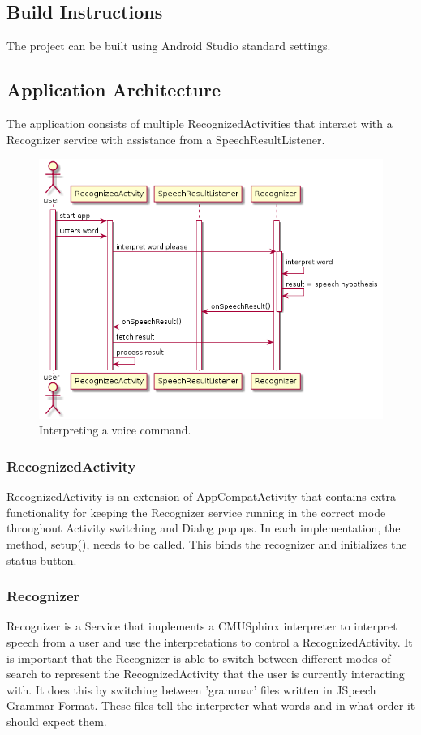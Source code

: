 \documentclass[11pt, oneside]{article}
\begin{document}
\subsection{Build Instructions}
The project can be built using Android Studio standard settings.

\subsection{Application Architecture}
The application consists of multiple RecognizedActivities that interact with a Recognizer service with assistance from a SpeechResultListener.

\begin{figure}[!h]
	\includegraphics[width=0.7\columnwidth]{speechsequence}
	\caption{Interpreting a voice command.}
\end{figure}

\subsubsection{RecognizedActivity}
RecognizedActivity is an extension of AppCompatActivity that contains extra functionality for keeping the Recognizer service running in the correct mode throughout Activity switching and Dialog popups. In each implementation, the method, setup(), needs to be called. This binds the recognizer and initializes the status button.

\subsubsection{Recognizer}
Recognizer is a Service that implements a CMUSphinx interpreter to interpret speech from a user and use the interpretations to control a RecognizedActivity. It is important that the Recognizer is able to switch between different modes of search to represent the RecognizedActivity that the user is currently interacting with. It does this by switching between 'grammar' files written in JSpeech Grammar Format. These files tell the interpreter what words and in what order it should expect them.
\end{document}
